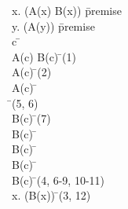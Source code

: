 \documentclass{article}
\begin{document}
\begin{proofbox}
\: \forall x. (A(x) \lor B(x)) \= \hbox{premise} \\
\: \forall y. (\lnot A(y)) \= \hbox{premise} \\
\open
\: c \= \forallintroconst \\
\: A(c) \lor B(c) \= \forallelim(1) \\
\: \lnot A(c) \= \forallelim(2) \\
\openAlt
\: A(c) \= \asm \\
\: \bot \= \notelim(5, 6) \\
\: B(c) \= \bottomelim(7) \\
\: B(c) \=  \\
\splitAlt
\: B(c) \= \asm \\
\: B(c) \=  \\
\closeAlt
\: B(c) \= \orelim(4, 6-9, 10-11) \\
\close
\: \forall x. (B(x)) \= \forallintro(3, 12) \\
\end{proofbox}
\end{document}
